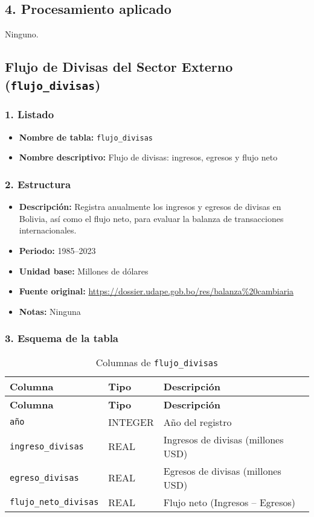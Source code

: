 \documentclass[12pt,a4paper]{article}
\begin{document}
\subsection*{4. Procesamiento aplicado}
Ninguno.

\newpage
\subsection{Flujo de Divisas del Sector Externo (\texttt{flujo\_divisas})}

\subsubsection*{1. Listado}
\begin{itemize}
  \item \textbf{Nombre de tabla:} \texttt{flujo\_divisas}
  \item \textbf{Nombre descriptivo:} Flujo de divisas: ingresos, egresos y flujo neto
\end{itemize}

\subsubsection*{2. Estructura}
\begin{itemize}
  \item \textbf{Descripción:} Registra anualmente los ingresos y egresos de divisas en Bolivia, así como el flujo neto, para evaluar la balanza de transacciones internacionales.
  \item \textbf{Periodo:} 1985--2023
  \item \textbf{Unidad base:} Millones de dólares
  \item \textbf{Fuente original:} \url{https://dossier.udape.gob.bo/res/balanza%20cambiaria}
  \item \textbf{Notas:} Ninguna
\end{itemize}

\subsubsection*{3. Esquema de la tabla}
\begin{longtable}{@{}lll@{}}
\caption{Columnas de \texttt{flujo\_divisas}}\\
\toprule
\textbf{Columna}         & \textbf{Tipo} & \textbf{Descripción} \\
\midrule
\endfirsthead
\toprule
\textbf{Columna}         & \textbf{Tipo} & \textbf{Descripción} \\
\midrule
\endhead
\bottomrule
\endfoot
\texttt{año}               & INTEGER & Año del registro \\
\texttt{ingreso\_divisas}   & REAL    & Ingresos de divisas (millones USD) \\
\texttt{egreso\_divisas}    & REAL    & Egresos de divisas (millones USD) \\
\texttt{flujo\_neto\_divisas} & REAL    & Flujo neto (Ingresos – Egresos) \\
\end{longtable}
\end{document}
